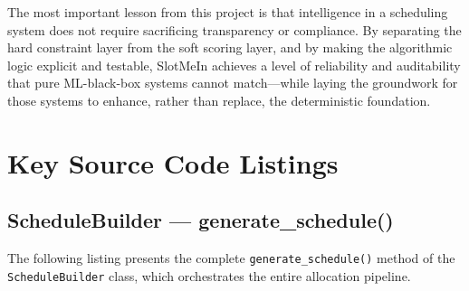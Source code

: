 The most important lesson from this project is that intelligence in a scheduling system does not require sacrificing transparency or compliance. By separating the hard constraint layer from the soft scoring layer, and by making the algorithmic logic explicit and testable, SlotMeIn achieves a level of reliability and auditability that pure ML-black-box systems cannot match—while laying the groundwork for those systems to enhance, rather than replace, the deterministic foundation.

\printbibliography[heading=bibintoc, title={Bibliography}]

\appendix

\chapter{Key Source Code Listings}

\section{ScheduleBuilder — generate\_schedule()}

The following listing presents the complete \texttt{generate\_schedule()} method of the \texttt{ScheduleBuilder} class, which orchestrates the entire allocation pipeline.

